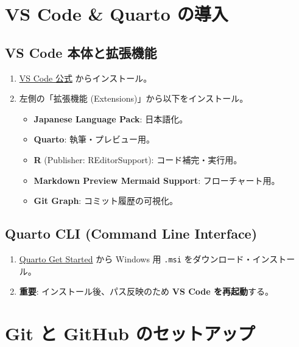 \documentclass[
  pandoc]{bxjsarticle}
\providecommand{\tightlist}{%
  \setlength{\itemsep}{0pt}\setlength{\parskip}{0pt}}
\begin{document}
\section{VS Code \& Quarto
の導入}\label{vs-code-quarto-ux306eux5c0eux5165}

\subsection{VS Code
本体と拡張機能}\label{vs-code-ux672cux4f53ux3068ux62e1ux5f35ux6a5fux80fd}

\begin{enumerate}
\def\labelenumi{\arabic{enumi}.}
\tightlist
\item
  \href{https://code.visualstudio.com/}{VS Code 公式} からインストール。
\item
  左側の「拡張機能 (Extensions)」から以下をインストール。

  \begin{itemize}
  \tightlist
  \item
    \textbf{Japanese Language Pack}: 日本語化。
  \item
    \textbf{Quarto}: 執筆・プレビュー用。
  \item
    \textbf{R} (Publisher: REditorSupport): コード補完・実行用。
  \item
    \textbf{Markdown Preview Mermaid Support}: フローチャート用。
  \item
    \textbf{Git Graph}: コミット履歴の可視化。
  \end{itemize}
\end{enumerate}

\subsection{Quarto CLI (Command Line
Interface)}\label{quarto-cli-command-line-interface}

\begin{enumerate}
\def\labelenumi{\arabic{enumi}.}
\tightlist
\item
  \href{https://quarto.org/docs/get-started/}{Quarto Get Started} から
  Windows 用 \texttt{.msi} をダウンロード・インストール。
\item
  \textbf{重要}: インストール後、パス反映のため \textbf{VS Code
  を再起動}する。
\end{enumerate}

\section{Git と GitHub
のセットアップ}\label{git-ux3068-github-ux306eux30bbux30c3ux30c8ux30a2ux30c3ux30d7}
\end{document}
